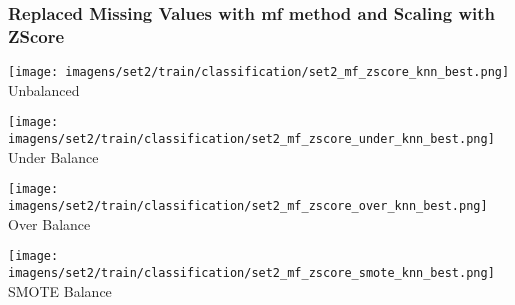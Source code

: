 \documentclass[11pt]{article}
\begin{document}
\subsubsection*{Replaced Missing Values with mf method and Scaling with ZScore}

\begin{figure*}[!htp]
    \begin{minipage}[!htp]{.25\textwidth}
        \centering
        \texttt{[image: imagens/set2/train/classification/set2\_mf\_zscore\_knn\_best.png]}
        Unbalanced
    \end{minipage}\hfill
    \begin{minipage}[!htp]{.25\textwidth}
        \centering
        \texttt{[image: imagens/set2/train/classification/set2\_mf\_zscore\_under\_knn\_best.png]}
        Under Balance
    \end{minipage}\hfill
    \begin{minipage}[!htp]{.25\textwidth}
        \centering
        \texttt{[image: imagens/set2/train/classification/set2\_mf\_zscore\_over\_knn\_best.png]}
        Over Balance
    \end{minipage}\hfill
    \begin{minipage}[!htp]{.25\textwidth}
        \centering
        \texttt{[image: imagens/set2/train/classification/set2\_mf\_zscore\_smote\_knn\_best.png]}
        SMOTE Balance
    \end{minipage}
\end{figure*}
\end{document}
